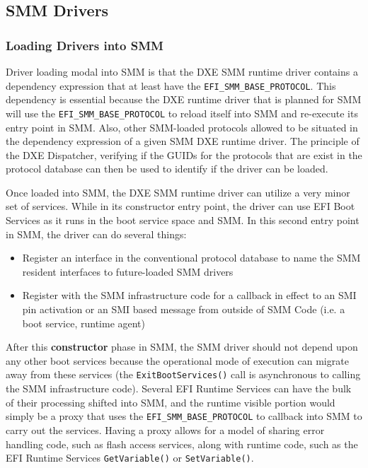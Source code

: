 \subsection{SMM Drivers}\label{subsection-smm-drivers}
\subsubsection{Loading Drivers into SMM}
Driver loading modal into SMM is that the DXE SMM runtime driver contains a dependency expression that at least have the \verb|EFI_SMM_BASE_PROTOCOL|. This dependency is essential because the DXE runtime driver that is planned for SMM will use the \verb|EFI_SMM_BASE_PROTOCOL| to reload itself into SMM and re-execute its entry point in SMM. Also, other SMM-loaded protocols allowed to be situated in the dependency expression of a given SMM DXE runtime driver. The principle of the DXE Dispatcher, verifying if the GUIDs for the protocols that are exist in the protocol database can then be used to identify if the driver can be loaded. 

Once loaded into SMM, the DXE SMM runtime driver can utilize a very minor set of services. While in its constructor entry point, the driver can use EFI Boot Services as it runs in the boot service space and SMM. In this second entry point in SMM, the driver can do several things:

\begin{itemize}
	\item Register an interface in the conventional protocol database to name the SMM resident interfaces to future-loaded SMM drivers
	\item Register with the SMM infrastructure code for a callback in effect to an SMI pin activation or an SMI based message from outside of SMM Code (i.e. a boot service, runtime agent)
\end{itemize}

After this \textbf{constructor} phase in SMM, the SMM driver should not depend upon any other boot services because the operational mode of execution can migrate away from these services (the \verb|ExitBootServices()| call is asynchronous to calling the SMM infrastructure code). Several EFI Runtime Services can have the bulk of their processing shifted into SMM, and the runtime visible portion would simply be a proxy that uses the \verb|EFI_SMM_BASE_PROTOCOL| to callback into SMM to carry out the services. Having a proxy allows for a model of sharing error handling code, such as flash access services, along with runtime code, such as the EFI Runtime Services \verb|GetVariable()| or \verb|SetVariable()|.


